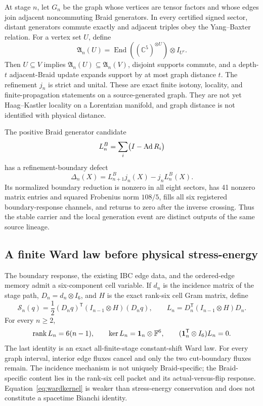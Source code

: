 At stage $n$, let $G_n$ be the graph whose vertices are tensor factors and whose edges join adjacent noncommuting Braid generators. In every certified signed sector, distant generators commute exactly and adjacent triples obey the Yang--Baxter relation. For a vertex set $U$, define
\begin{equation}\label{eq:localnet}
 \mathfrak A_n(U)=\operatorname{End}\!\left((\mathbb C^5)^{\otimes U}\right)\otimes I_{U^c}.
\end{equation}
Then $U\subseteq V$ implies $\mathfrak A_n(U)\subseteq\mathfrak A_n(V)$, disjoint supports commute, and a depth-$t$ adjacent-Braid update expands support by at most graph distance $t$. The refinement $j_n$ is strict and unital. These are exact finite isotony, locality, and finite-propagation statements on a source-generated graph. They are not yet Haag--Kastler locality on a Lorentzian manifold, and graph distance is not identified with physical distance.

The positive Braid generator candidate
\begin{equation}\label{eq:braidgenerator}
 L_n^B=\sum_i\bigl(I-\operatorname{Ad} R_i\bigr)
\end{equation}
has a refinement-boundary defect
\begin{equation}\label{eq:boundarydefect}
 \Delta_n(X)=L_{n+1}^Bj_n(X)-j_nL_n^B(X).
\end{equation}
Its normalized boundary reduction is nonzero in all eight sectors, has 41 nonzero matrix entries and squared Frobenius norm $108/5$, fills all six registered boundary-response channels, and returns to zero after the inverse crossing. Thus the stable carrier and the local generation event are distinct outputs of the same source lineage.

\subsection{A finite Ward law before physical stress-energy}

The boundary response, the existing IBC edge data, and the ordered-edge memory admit a six-component cell variable. If $d_n$ is the incidence matrix of the stage path, $D_n=d_n\otimes I_6$, and $H$ is the exact rank-six cell Gram matrix, define
\begin{equation}\label{eq:wardaction}
 \mathcal S_n(q)=\frac12(D_nq)^{\mathsf T}(I_{n-1}\otimes H)(D_nq),
 \qquad
 L_n=D_n^{\mathsf T}(I_{n-1}\otimes H)D_n.
\end{equation}
For every $n\ge2$,
\begin{equation}\label{eq:wardkernel}
 \operatorname{rank} L_n=6(n-1),\qquad
 \ker L_n=\mathbf1_n\otimes\mathbb F^6,
 \qquad
 (\mathbf1_n^{\mathsf T}\otimes I_6)L_n=0.
\end{equation}
The last identity is an exact all-finite-stage constant-shift Ward law. For every graph interval, interior edge fluxes cancel and only the two cut-boundary fluxes remain. The incidence mechanism is not uniquely Braid-specific; the Braid-specific content lies in the rank-six cell packet and its actual-versus-flip response. Equation~\eqref{eq:wardkernel} is weaker than stress-energy conservation and does not constitute a spacetime Bianchi identity.

